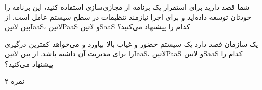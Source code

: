 \documentclass[../main.tex]{subfiles}
\begin{document}

شما قصد دارید برای استقرار یک برنامه از مجازی‌سازی استفاده کنید، این برنامه را خودتان توسعه داده‌اید و برای اجرا نیازمند تنظیمات در سطح سیستم عامل است.
از بین ‌لاتین{IaaS}، ‌لاتین{PaaS} و ‌لاتین{SaaS} کدام را پیشنهاد می‌کنید؟

یک سازمان قصد دارد یک سیستم حضور و غیاب بالا بیاورد و می‌خواهد کمترین درگیری را برای مدیریت آن داشته باشد.
از بین ‌لاتین{IaaS}، ‌لاتین{PaaS} و ‌لاتین{SaaS} کدام را پیشنهاد می‌کنید؟

۲ نمره
\end{document}
